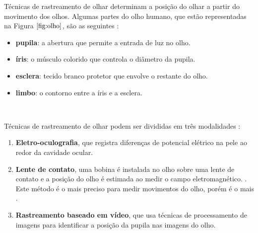 Técnicas de rastreamento de olhar determinam a posição do olhar a partir do movimento dos olhos. Algumas partes do olho humano, que estão representadas na Figura $\ref{fig:olho}$,  são as seguintes \cite{lidade}:


\begin{itemize}
\item \textbf{pupila}: a abertura que permite a entrada de luz no olho.
\item \textbf{íris}: o músculo colorido que controla o diâmetro da pupila.
\item \textbf{esclera}: tecido branco protetor que envolve o restante do olho.
\item \textbf{limbo}: o contorno entre a íris e a esclera.
\end{itemize}


~ %

Técnicas de rastreamento de olhar podem ser divididas em três modalidades \cite{valenti2009webcam}:

\begin{enumerate}
\item {\bf Eletro-oculografia}, que registra diferenças de potencial elétrico na pele ao redor da cavidade ocular.
\item {\bf Lente de contato}, uma bobina é instalada no olho sobre uma lente de contato e a posição do olho é estimada ao medir o campo eletromagnético. \cite{duchowski2007eye}. Este método é o mais preciso para medir movimentos do olho, porém é o mais  \cite{duchowski2007eye}.

\item  {\bf Rastreamento baseado em vídeo}, que usa técnicas de processamento de imagens para identificar a posição da pupila nas imagens do olho. 
\end{enumerate}

